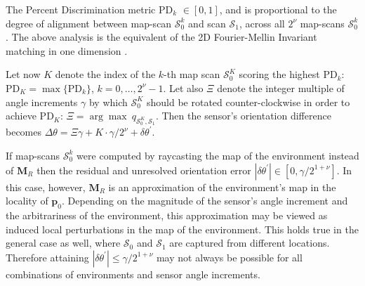 The Percent Discrimination metric PD$_k$ $\in [0,1]$, and is proportional to
the degree of alignment between map-scan $\mathcal{S}_0^k$ and
scan $\mathcal{S}_1$, across all $2^\nu$ map-scans $\mathcal{S}_0^k$.
The above analysis is the equivalent of the 2D Fourier-Mellin Invariant
matching in one dimension \cite{Qin-ShengChen1994}.

Let now $K$ denote the index of the $k$-th map scan
$\mathcal{S}_0^K$ scoring the highest PD$_k$: $\text{PD}_K =
\max \{\text{PD}_k\}$, $k = 0,\dots,2^\nu-1$. Let also $\Xi$ denote the integer
multiple of angle increments $\gamma$ by which $\mathcal{S}_0^K$
should be rotated counter-clockwise in order to achieve PD$_K$:
$\Xi = \arg\max\ q_{\mathcal{S}_0^K, \mathcal{S}_1}$.  Then the sensor's
orientation difference becomes
$\Delta\theta = \Xi\gamma + K \cdot \gamma/2^\nu + \delta\theta^\prime$.

If map-scans $\mathcal{S}_0^k$ were computed by raycasting the map of the
environment instead of $\bm{M}_R$ then the residual and unresolved orientation
error $|\delta\theta^\prime| \in [0,\gamma / 2^{1+\nu}]$. In this case, however,
$\bm{M}_R$ is an approximation of the environment's map in the locality of
$\bm{p}_0$. Depending on the magnitude of the sensor's angle increment and
the arbitrariness of the environment, this approximation may be viewed as
induced local perturbations in the map of the environment. This holds true
in the general case as well, where $\mathcal{S}_0$ and $\mathcal{S}_1$ are
captured from different locations. Therefore attaining
$|\delta\theta^\prime| \leq \gamma / 2^{1+\nu}$ may not always be possible
for all combinations of environments and sensor angle increments.
